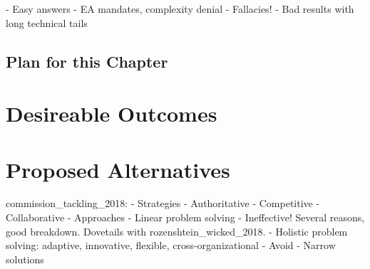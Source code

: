 - Easy answers
  - EA mandates, complexity denial
- Fallacies!
- Bad results with long technical tails


\subsection{Plan for this Chapter}


\section{Desireable Outcomes}


\section{Proposed Alternatives}



commission_tackling_2018:
- Strategies
  - Authoritative
  - Competitive
  - Collaborative
- Approaches
  - Linear problem solving
    - Ineffective! Several reasons, good breakdown. Dovetails with rozenshtein_wicked_2018.
  - Holistic problem solving: adaptive, innovative, flexible, cross-organizational
- Avoid
  - Narrow solutions

